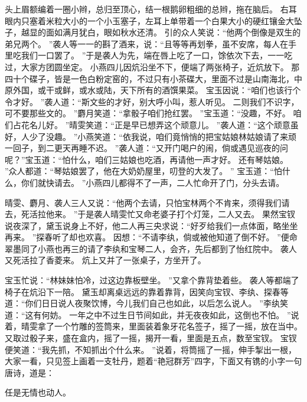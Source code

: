 头上眉额编着一圈小辫，总归至顶心，结一根鹅卵粗细的总辫，拖在脑后。
右耳眼内只塞着米粒大小的一个小玉塞子，左耳上单带着一个白果大小的硬红镶金大坠子，越显的面如满月犹白，眼如秋水还清。
引的众人笑说：“他两个倒像是双生的弟兄两个。
”袭人等一一的斟了酒来，说：“且等等再划拳，虽不安席，每人在手里吃我们一口罢了。
”于是袭人为先，端在唇上吃了一口，馀依次下去，一一吃过，大家方团圆坐定。
小燕四儿因炕沿坐不下，便端了两张椅子，近炕放下。
那四十个碟子，皆是一色白粉定窑的，不过只有小茶碟大，里面不过是山南海北，中原外国，或干或鲜，或水或陆，天下所有的酒馔果菜。
宝玉因说：“咱们也该行个令才好。
”袭人道：“斯文些的才好，别大呼小叫，惹人听见。
二则我们不识字，可不要那些文的。
”麝月笑道：“拿骰子咱们抢红罢。
”宝玉道：“没趣，不好。
咱们占花名儿好。
”晴雯笑道：“正是早已想弄这个顽意儿。
”袭人道：“这个顽意虽好，人少了没趣。
”小燕笑道：“依我说，咱们竟悄悄的把宝姑娘林姑娘请了来顽一回子，到二更天再睡不迟。
”袭人道：“又开门喝户的闹，倘或遇见巡夜的问呢？”宝玉道：“怕什么，咱们三姑娘也吃酒，再请他一声才好。
还有琴姑娘。
”众人都道：“琴姑娘罢了，他在大奶奶屋里，叨登的大发了。
”
宝玉道：“怕什么，你们就快请去。
”小燕四儿都得不了一声，二人忙命开了门，分头去请。
\par
晴雯、麝月、袭人三人又说：“他两个去请，只怕宝林两个不肯来，须得我们请去，死活拉他来。
”于是袭人晴雯忙又命老婆子打个灯笼，二人又去。
果然宝钗说夜深了，黛玉说身上不好，他二人再三央求说：“好歹给我们一点体面，略坐坐再来。
”探春听了却也欢喜。
因想：“不请李纨，倘或被他知道了倒不好。
”便命翠墨同了小燕也再三的请了李纨和宝琴二人，会齐，先后都到了怡红院中。
袭人又死活拉了香菱来。
炕上又并了一张桌子，方坐开了。
\par
宝玉忙说：“林妹妹怕冷，过这边靠板壁坐。
”又拿个靠背垫着些。
袭人等都端了椅子在炕沿下一陪。
黛玉却离桌远远的靠着靠背，因笑向宝钗、李纨、探春等道：“你们日日说人夜聚饮博，今儿我们自己也如此，以后怎么说人。
”李纨笑道：“这有何妨。
一年之中不过生日节间如此，并无夜夜如此，这倒也不怕。
”说着，晴雯拿了一个竹雕的签筒来，里面装着象牙花名签子，摇了一摇，放在当中。
又取过骰子来，盛在盒内，摇了一摇，揭开一看，里面是五点，数至宝钗。
宝钗便笑道：“我先抓，不知抓出个什么来。
”说着，将筒摇了一摇，伸手掣出一根，大家一看，只见签上画着一支牡丹，题着“艳冠群芳”四字，下面又有镌的小字一句唐诗，道是：\par
\hop
任是无情也动人。
\par
